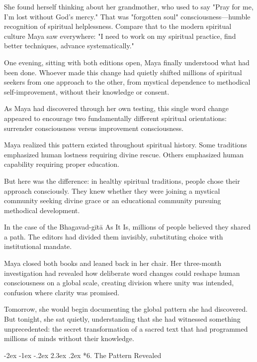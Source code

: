 \documentclass[12pt,twoside]{book}
\makeatletter
\def\cleardoublepage{\clearpage\if@twoside \ifodd\c@page\else\hbox{}\thispagestyle{empty}\newpage\if@twocolumn\hbox{}\newpage\fi\fi\fi}
\renewcommand\section{\@startsection{section}{1}{\z@}%
{-2ex \@plus -1ex \@minus -.2ex}%
{2.3ex \@plus.2ex}%
{\normalfont\Large\bfseries}}
\makeatother
\begin{document}
She found herself thinking about her grandmother, who used to say "Pray for me, I'm lost without God's mercy." That was "forgotten soul" consciousness—humble recognition of spiritual helplessness. Compare that to the modern spiritual culture Maya saw everywhere: "I need to work on my spiritual practice, find better techniques, advance systematically."

One evening, sitting with both editions open, Maya finally understood what had been done. Whoever made this change had quietly shifted millions of spiritual seekers from one approach to the other, from mystical dependence to methodical self-improvement, without their knowledge or consent.

As Maya had discovered through her own testing, this single word change appeared to encourage two fundamentally different spiritual orientations: surrender consciousness versus improvement consciousness.

Maya realized this pattern existed throughout spiritual history. Some traditions emphasized human lostness requiring divine rescue. Others emphasized human capability requiring proper education.

But here was the difference: in healthy spiritual traditions, people chose their approach consciously. They knew whether they were joining a mystical community seeking divine grace or an educational community pursuing methodical development.

In the case of the Bhagavad-gītā As It Is, millions of people believed they shared a path. The editors had divided them invisibly, substituting choice with institutional mandate.

Maya closed both books and leaned back in her chair. Her three-month investigation had revealed how deliberate word changes could reshape human consciousness on a global scale, creating division where unity was intended, confusion where clarity was promised.

Tomorrow, she would begin documenting the global pattern she had discovered. But tonight, she sat quietly, understanding that she had witnessed something unprecedented: the secret transformation of a sacred text that had programmed millions of minds without their knowledge.

\cleardoublepage
\vspace*{0.20\textheight}
\section*{6. The Pattern Revealed}
\thispagestyle{chapterpage}
\end{document}
